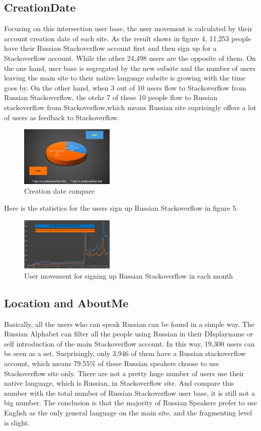 \documentclass[A4paper,twoside,twocolumn]{article}
\begin{document}
\subsection{CreationDate}
Focusing on this intersection user base, the user movement is calculated by their account creation date of each site. As the result shows in figure 4, 11,253 people have their Russian Stackoverflow account first and then sign up for a Stackoverflow account. While the other 24,498 users are the opposite of them. On the one hand, user base is segregated by the new subsite and the number of users leaving the main site to their native language subsite is growing with the time goes by.  On the other hand, when 3 out of 10 users flow to Stackoverflow from Russian Stackoverflow, the otehr 7 of these 10 people flow to Russian stackoverflow from Stackoverflow,which means Russian site suprisingly offers a lot of users as feedback to Stackoverflow.
	\begin{figure}[H]
		\includegraphics[width = 0.4\textwidth]{user2.png}
		\caption{Creation date compare}
	\end{figure}
Here is the statistics for the users sign up Russian Stackoverflow in figure 5. 
	\begin{figure}[H]
		\includegraphics[width = 0.4\textwidth]{user1.png}
		\caption{User movement for signing up Russian Stackoverflow in each month}
  	\end{figure}

\subsection{Location and AboutMe}
Basically, all the users who can speak Russian can be found in a simple way. The Russian Alphabet can filter all the people using Russian in their DIsplayname or self introduction of the main Stackoverflow account.  In this way, 19,300 users can be seen as a set. Surprisingly, only 3,946 of them have a Russian stackoverflow account, which means 79.55\% of these Russian speakers choose to use Stackoverflow site only.
There are not a pretty huge number of users use their native language, which is Russian, in Stackoverflow site. And compare this number with the total number of Russian Stackoverflow user base, it is still not a big number. The conclusion is that  the majority of Russian Speakers prefer to use English as the only general language on the main site, and the fragmenting level is slight.
\end{document}
